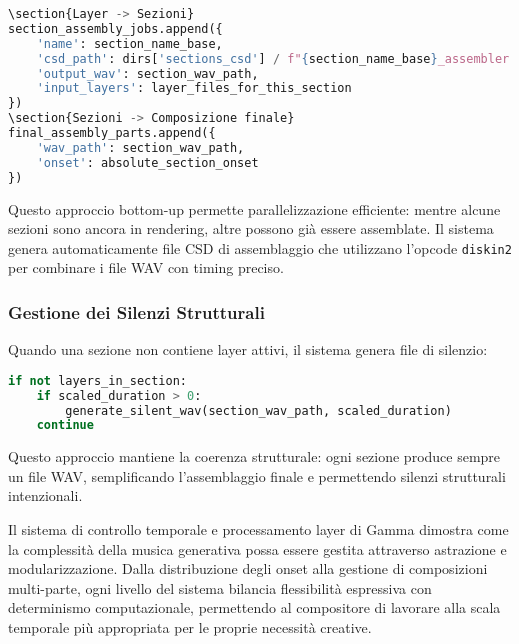 \begin{lstlisting}[language=Python]
\section{Layer -> Sezioni}
section_assembly_jobs.append({
    'name': section_name_base,
    'csd_path': dirs['sections_csd'] / f"{section_name_base}_assembler.csd",
    'output_wav': section_wav_path,
    'input_layers': layer_files_for_this_section
})
\section{Sezioni -> Composizione finale}
final_assembly_parts.append({
    'wav_path': section_wav_path,
    'onset': absolute_section_onset
})
\end{lstlisting}

Questo approccio bottom-up permette parallelizzazione efficiente: mentre alcune sezioni sono ancora in rendering, altre possono già essere assemblate. Il sistema genera automaticamente file CSD di assemblaggio che utilizzano l'opcode \texttt{diskin2} per combinare i file WAV con timing preciso.
\subsubsection{Gestione dei Silenzi Strutturali}
Quando una sezione non contiene layer attivi, il sistema genera file di silenzio:

\begin{lstlisting}[language=Python]
if not layers_in_section:
    if scaled_duration > 0:
        generate_silent_wav(section_wav_path, scaled_duration)
    continue
\end{lstlisting}

Questo approccio mantiene la coerenza strutturale: ogni sezione produce sempre un file WAV, semplificando l'assemblaggio finale e permettendo silenzi strutturali intenzionali.

Il sistema di controllo temporale e processamento layer di Gamma dimostra come la complessità della musica generativa possa essere gestita attraverso astrazione e modularizzazione. Dalla distribuzione degli onset alla gestione di composizioni multi-parte, ogni livello del sistema bilancia flessibilità espressiva con determinismo computazionale, permettendo al compositore di lavorare alla scala temporale più appropriata per le proprie necessità creative.
